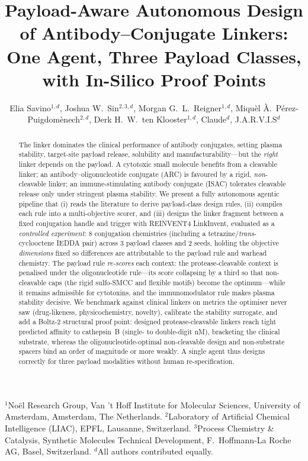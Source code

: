 \documentclass[10pt]{article}
\title{\textbf{Payload-Aware Autonomous Design of Antibody--Conjugate Linkers: One Agent, Three Payload Classes, with In-Silico Proof Points}}
\author{Elia Savino$^{1,d}$, Joshua W.\ Sin$^{2,3,d}$, Morgan G.\ L.\ Reigner$^{1,d}$, Miqu\`el \`A.\ P\'erez-Puigdom\`enech$^{2,d}$, Derk H.\ W.\ ten Klooster$^{1,d}$, Claude$^{d}$, J.A.R.V.I.S$^{d}$}
\date{}
\begin{document}
\maketitle
\begin{center}\footnotesize $^{1}$Noël Research Group, Van 't Hoff Institute for Molecular Sciences, University of Amsterdam, Amsterdam, The Netherlands. $^{2}$Laboratory of Artificial Chemical Intelligence (LIAC), EPFL, Lausanne, Switzerland. $^{3}$Process Chemistry \& Catalysis, Synthetic Molecules Technical Development, F.\ Hoffmann-La Roche AG, Basel, Switzerland. $^{d}$All authors contributed equally.\end{center}
\begin{abstract}
The linker dominates the clinical performance of antibody conjugates, setting plasma stability, target-site payload release, solubility and manufacturability---but the \emph{right} linker depends on the payload. A cytotoxic small molecule benefits from a cleavable linker; an antibody--oligonucleotide conjugate (ARC) is favoured by a rigid, \emph{non}-cleavable linker; an immune-stimulating antibody conjugate (ISAC) tolerates cleavable release only under stringent plasma stability. We present a fully autonomous agentic pipeline that (i) reads the literature to derive payload-class design rules, (ii) compiles each rule into a multi-objective scorer, and (iii) designs the linker fragment between a fixed conjugation handle and trigger with REINVENT4 LinkInvent, evaluated as a \emph{controlled experiment}: 8 conjugation chemistries (including a tetrazine/\emph{trans}-cyclooctene IEDDA pair) across 3 payload classes and 2 seeds, holding the objective \emph{dimensions} fixed so differences are attributable to the payload rule and warhead chemistry. The payload rule \emph{re-scores} each context: the protease-cleavable context is penalised under the oligonucleotide rule---its score collapsing by a third so that non-cleavable caps (the rigid sulfo-SMCC and flexible motifs) become the optimum---while it remains admissible for cytotoxins, and the immunomodulator rule makes plasma stability decisive. We benchmark against clinical linkers on metrics the optimiser never saw (drug-likeness, physicochemistry, novelty), calibrate the stability surrogate, and add a Boltz-2 structural proof point: designed protease-cleavable linkers reach tight predicted affinity to cathepsin~B (single- to double-digit nM), bracketing the clinical substrate, whereas the oligonucleotide-optimal non-cleavable design and non-substrate spacers bind an order of magnitude or more weakly. A single agent thus designs correctly for three payload modalities without human re-specification.
\end{abstract}
\end{document}
